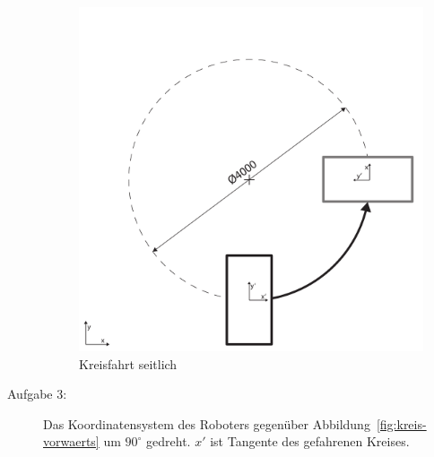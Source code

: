 \begin{description}
    \begin{figure}[H]
        \centering
        \includegraphics[width=.6\textwidth]{Abbildungen/Viertelkreis-seitwaerts}
        \caption{Kreisfahrt seitlich}
        \label{fig:kreis-seitwaerts}
    \end{figure}
    \item[Aufgabe 3:]
    Das Koordinatensystem des Roboters gegenüber Abbildung~\ref{fig:kreis-vorwaerts} um $90^\circ$ gedreht. $x'$ ist Tangente des gefahrenen Kreises.
\end{description}
